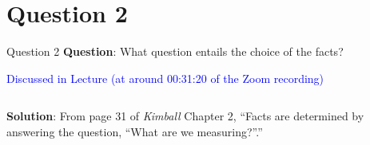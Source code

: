\section*{Question 2}
\begin{frame}[fragile]{Question 2}
\textbf{Question}: What question entails the choice of the facts?\\\vspace{10pt}

\textcolor{blue}{Discussed in Lecture (at around 00:31:20 of the Zoom recording)}\\\vspace{10pt}

\begin{columns}[t,onlytextwidth]
\textbf{Solution}: From page 31 of \textit{Kimball} Chapter 2, ``Facts are determined by answering the question, ``What are we measuring?''.''\\ \vspace{10pt}


\end{columns}
\end{frame}
